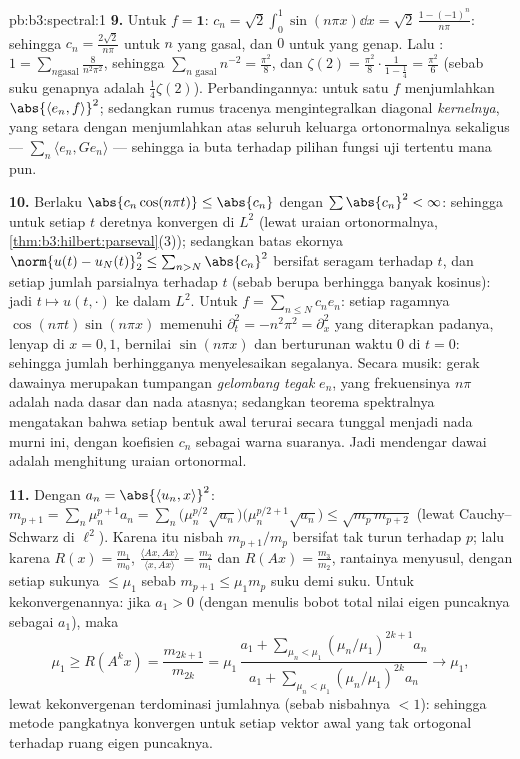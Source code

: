 \begin{solution}{pb:b3:spectral:1}
\textbf{9.} Untuk $f = \mathbf 1$: $c_n =
\sqrt2\int_0^1\sin(n\pi x)\dd x = \sqrt2\,\frac{1 -
(-1)^n}{n\pi}$: sehingga $c_n = \frac{2\sqrt2}{n\pi}$ untuk $n$ yang gasal, dan $0$
untuk yang genap. Lalu : $1 = \sum_{n\text{
gasal}}\frac{8}{n^2\pi^2}$, sehingga $\sum_{n\text{ gasal}}n^{-2} =
\frac{\pi^2}8$, dan $\zeta(2) = \frac{\pi^2}8\cdot\frac{1}{1
- \frac14} = \frac{\pi^2}6$ (sebab suku genapnya adalah $\frac14\zeta(2)$).
Perbandingannya:  untuk satu $f$ menjumlahkan
$\abs{\langle e_n, f\rangle}^2$; sedangkan rumus tracenya mengintegralkan
diagonal \emph{kernelnya}, yang setara dengan menjumlahkan
 atas seluruh keluarga ortonormalnya sekaligus ---
$\sum_n\langle e_n, Ge_n\rangle$ --- sehingga ia buta terhadap
pilihan fungsi uji tertentu mana pun.

\textbf{10.} Berlaku $\abs{c_n\cos(n\pi t)} \leq \abs{c_n}$ dengan
$\sum\abs{c_n}^2 < \infty$: sehingga untuk setiap $t$ deretnya konvergen
di $L^2$ (lewat uraian ortonormalnya,
\cref{thm:b3:hilbert:parseval}(3)); sedangkan batas ekornya
$\norm{u(t) - u_N(t)}_2^2 \leq \sum_{n>N}\abs{c_n}^2$ bersifat
seragam terhadap $t$, dan setiap jumlah parsialnya  terhadap $t$
(sebab berupa berhingga banyak kosinus): jadi $t \mapsto u(t,\cdot)$ 
ke dalam $L^2$. Untuk $f = \sum_{n\leq N}c_ne_n$: setiap ragamnya
$\cos(n\pi t)\sin(n\pi x)$ memenuhi $\partial_t^2 =
-n^2\pi^2 = \partial_x^2$ yang diterapkan padanya, lenyap di $x = 0,
1$, bernilai $\sin(n\pi x)$ dan berturunan waktu $0$ di $t =
0$: sehingga jumlah berhingganya menyelesaikan segalanya. Secara musik: gerak
dawainya merupakan tumpangan \emph{gelombang tegak} $e_n$,
yang frekuensinya $n\pi$ adalah nada dasar dan
nada atasnya; sedangkan teorema spektralnya mengatakan bahwa setiap bentuk awal
terurai secara tunggal menjadi nada murni ini, dengan koefisien
$c_n$ sebagai warna suaranya. Jadi mendengar dawai adalah menghitung
uraian ortonormal.

\textbf{11.} Dengan $a_n = \abs{\langle u_n, x\rangle}^2$:
$m_{p+1} = \sum_n\mu_n^{p+1}a_n = \sum_n\bigl(\mu_n^{p/2}
\sqrt{a_n}\bigr)\bigl(\mu_n^{p/2+1}\sqrt{a_n}\bigr) \leq
\sqrt{m_p\,m_{p+2}}$ (lewat Cauchy--Schwarz di $\ell^2$). Karena itu
nisbah $m_{p+1}/m_p$ bersifat tak turun terhadap $p$; lalu karena
$R(x) = \frac{m_1}{m_0}$, $\frac{\langle Ax, Ax\rangle}
{\langle x, Ax\rangle} = \frac{m_2}{m_1}$ dan $R(Ax) =
\frac{m_3}{m_2}$, rantainya menyusul, dengan setiap sukunya $\leq \mu_1$
sebab $m_{p+1} \leq \mu_1m_p$ suku demi suku. Untuk kekonvergenannya: jika
$a_1 > 0$ (dengan menulis bobot total nilai eigen puncaknya sebagai
$a_1$), maka
\[
\mu_1 \geq R(A^kx) = \frac{m_{2k+1}}{m_{2k}} =
\mu_1\,\frac{a_1 + \sum_{\mu_n<\mu_1}(\mu_n/\mu_1)^{2k+1}
a_n}{a_1 + \sum_{\mu_n<\mu_1}(\mu_n/\mu_1)^{2k}a_n}
\longrightarrow \mu_1,
\]
lewat kekonvergenan terdominasi jumlahnya (sebab nisbahnya $< 1$): sehingga
metode pangkatnya konvergen untuk setiap vektor awal yang tak
ortogonal terhadap ruang eigen puncaknya.


\end{solution}
